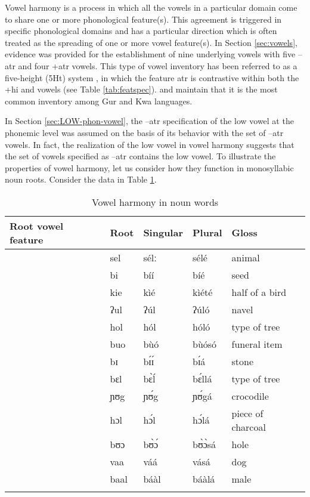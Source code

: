 Vowel harmony is a process in  which all the vowels in a particular domain come
to share one or more phonological feature(s).   This agreement  is
triggered in specific phonological domains and  has a
particular direction which is often treated as the spreading of one or more
vowel feature(s).  In Section \ref{sec:vowels},  evidence was provided for the 
establishment of
nine
underlying vowels with five {\sc --atr} and four  {\sc +atr} vowels. This
type of  vowel inventory has been referred to as  a five-height (5Ht) system 
\citep[308]{Casa03},  in which the
feature {\sc atr} is contrastive within both the {\sc +hi} and {\sc [--hi,
--lo]} vowels (see Table \ref{tab:featspec}).  \citet[81--82]{Daku97} and
\citet[312]{Casa03} maintain that it is the most common inventory among
Gur and Kwa languages. 


In Section \ref{sec:LOW-phon-vowel},  the
{\sc --atr} specification of the low vowel at the phonemic level was assumed
  on the basis of its behavior with the set of {\sc --atr} vowels. In
fact, the  realization of the low vowel in vowel harmony suggests that the set
of vowels specified as {\sc --atr}  contains the low vowel. To illustrate
the properties of vowel harmony, let us consider
how they function in  monosyllabic noun roots. Consider the data in
Table
\ref{tab:examples-harmony}.



\begin{table}[!htb]
\small
\centering
\caption{Vowel harmony in noun words\label{tab:examples-harmony}}
 \begin{tabular}{lllll}
\lsptoprule
Root vowel feature & Root &  Singular & Plural & Gloss\\ \midrule

{\sc [+atr, --hi, --lo, --ro]} &sel& sélː&sélé & animal\\
{\sc [+atr, +hi, --lo, --ro]} &bi &bíí &bíé& seed \\
{\sc [+atr, --lo, --ro]} &kie&  kìé 	&kìété	&half of a bird\\
{\sc [+atr, +hi, --lo, +ro]} &ʔul & ʔúl 	& ʔúló 	 
 & 	navel\\
{\sc [+atr, --hi, --lo, +ro]} &hol& hól & hóló & type of tree   \\
{\sc [+atr, --lo, +ro]} &buo& bùó 	& bùósó  &	funeral item\\
{\sc [--atr, +hi, --ro]} &bɪ& bɪ́ɪ́	&	bɪ́á 		&	stone\\
{\sc [--atr,  --hi, --lo, --ro]} &bɛl & bɛ̀ĺ &bɛ́llá & type of tree \\
{\sc [--atr, +hi, --lo, +ro]} & ɲʊg& ɲʊ́g & ɲʊ́gá & crocodile \\
{\sc [--atr,  --hi, --lo, +ro]} & hɔl& hɔ́l & hɔ́lá & piece of charcoal  \\
{\sc [--atr, --lo, +ro]} & bʊɔ& bʊ̀ɔ́	& bʊ̀ɔ̀sá	  &	hole\\
{\sc [--atr, +lo]} &vaa& váá  & vásá & dog \\
{\sc  [--atr, +lo]} &baal& báàl& báàlá& male \\

  \lspbottomrule
 \end{tabular}

\end{table}  

